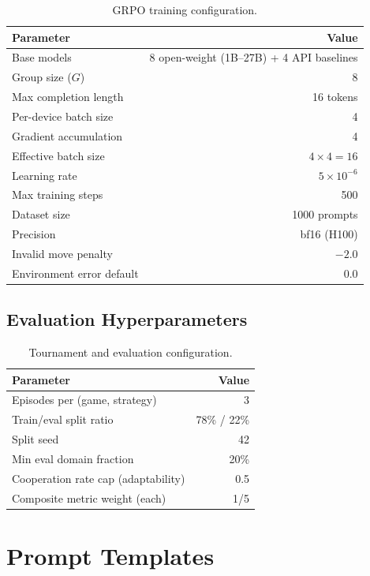\begin{table}[h]
\centering\small
\caption{GRPO training configuration.}
\begin{tabular}{@{}lr@{}}
\toprule
\textbf{Parameter} & \textbf{Value} \\
\midrule
Base models & 8 open-weight (1B--27B) + 4 API baselines \\
Group size ($G$) & 8 \\
Max completion length & 16 tokens \\
Per-device batch size & 4 \\
Gradient accumulation & 4 \\
Effective batch size & $4 \times 4 = 16$ \\
Learning rate & $5 \times 10^{-6}$ \\
Max training steps & 500 \\
Dataset size & 1000 prompts \\
Precision & bf16 (H100) \\
Invalid move penalty & $-2.0$ \\
Environment error default & $0.0$ \\
\bottomrule
\end{tabular}
\end{table}

\subsection{Evaluation Hyperparameters}

\begin{table}[h]
\centering\small
\caption{Tournament and evaluation configuration.}
\begin{tabular}{@{}lr@{}}
\toprule
\textbf{Parameter} & \textbf{Value} \\
\midrule
Episodes per (game, strategy) & 3 \\
Train/eval split ratio & 78\% / 22\% \\
Split seed & 42 \\
Min eval domain fraction & 20\% \\
Cooperation rate cap (adaptability) & 0.5 \\
Composite metric weight (each) & 1/5 \\
\bottomrule
\end{tabular}
\end{table}

\section{Prompt Templates}
\label{app:prompts}

